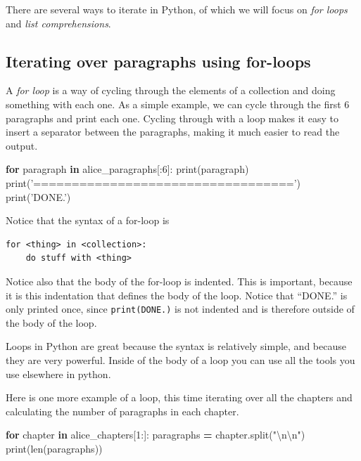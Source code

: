 \documentclass[]{book}
\newenvironment{Shaded}{\begin{snugshade}}{\end{snugshade}}
\newcommand{\KeywordTok}[1]{\textcolor[rgb]{0.13,0.29,0.53}{\textbf{#1}}}
\newcommand{\DecValTok}[1]{\textcolor[rgb]{0.00,0.00,0.81}{#1}}
\newcommand{\CharTok}[1]{\textcolor[rgb]{0.31,0.60,0.02}{#1}}
\newcommand{\StringTok}[1]{\textcolor[rgb]{0.31,0.60,0.02}{#1}}
\newcommand{\ControlFlowTok}[1]{\textcolor[rgb]{0.13,0.29,0.53}{\textbf{#1}}}
\newcommand{\OperatorTok}[1]{\textcolor[rgb]{0.81,0.36,0.00}{\textbf{#1}}}
\newcommand{\BuiltInTok}[1]{#1}
\newcommand{\NormalTok}[1]{#1}
\begin{document}
There are several ways to iterate in Python, of which we will focus on
\emph{for loops} and \emph{list comprehensions}.

\subsection{Iterating over paragraphs using
for-loops}\label{iterating-over-paragraphs-using-for-loops}

A \emph{for loop} is a way of cycling through the elements of a
collection and doing something with each one. As a simple example, we
can cycle through the first 6 paragraphs and print each one. Cycling
through with a loop makes it easy to insert a separator between the
paragraphs, making it much easier to read the output.

\begin{Shaded}
\begin{Highlighting}[]
\ControlFlowTok{for}\NormalTok{ paragraph }\KeywordTok{in}\NormalTok{ alice_paragraphs[:}\DecValTok{6}\NormalTok{]:}
    \BuiltInTok{print}\NormalTok{(paragraph)}
    \BuiltInTok{print}\NormalTok{(}\StringTok{'=================================='}\NormalTok{)}
\BuiltInTok{print}\NormalTok{(}\StringTok{'DONE.'}\NormalTok{)}
\end{Highlighting}
\end{Shaded}

Notice that the syntax of a for-loop is

\begin{verbatim}
for <thing> in <collection>:
    do stuff with <thing>
\end{verbatim}

Notice also that the body of the for-loop is indented. This is
important, because it is this indentation that defines the body of the
loop. Notice that ``DONE.'' is only printed once, since
\texttt{print(\textquotesingle{}DONE.\textquotesingle{})} is not
indented and is therefore outside of the body of the loop.

Loops in Python are great because the syntax is relatively simple, and
because they are very powerful. Inside of the body of a loop you can use
all the tools you use elsewhere in python.

Here is one more example of a loop, this time iterating over all the
chapters and calculating the number of paragraphs in each chapter.

\begin{Shaded}
\begin{Highlighting}[]
\ControlFlowTok{for}\NormalTok{ chapter }\KeywordTok{in}\NormalTok{ alice_chapters[}\DecValTok{1}\NormalTok{:]:}
\NormalTok{    paragraphs }\OperatorTok{=}\NormalTok{ chapter.split(}\StringTok{"}\CharTok{\textbackslash{}n\textbackslash{}n}\StringTok{"}\NormalTok{)}
    \BuiltInTok{print}\NormalTok{(}\BuiltInTok{len}\NormalTok{(paragraphs))}
\end{Highlighting}
\end{Shaded}
\end{document}
